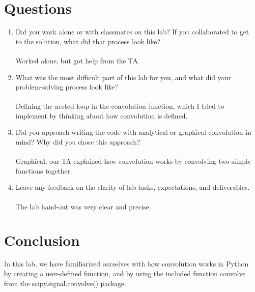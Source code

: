 \documentclass[12pt,a4paper]{article}
\begin{document}
\section{Questions}\label{sec:res}
\begin{enumerate}
    \item
    Did you work alone or with classmates on this lab? If you collaborated to get to the solution,
    what did that process look like?\\
    \\Worked alone, but got help from the TA.\\
    
    \item
    What was the most difficult part of this lab for you, and what did your problem-solving
    process look like?\\
    \\Defining the nested loop in the convolution function, which I tried to implement by thinking about how convolution is defined.\\
    
    \item
    Did you approach writing the code with analytical or graphical convolution in mind? Why
    did you chose this approach?\\
    \\Graphical, our TA explained how convolution works by convolving two simple functions together. \\
    
    \item
    Leave any feedback on the clarity of lab tasks, expectations, and deliverables.\\
    \\The lab hand-out was very clear and precise.
    
\end{enumerate}
\section{Conclusion}\label{sec:res}
    In this lab, we have familiarized ourselves with how convolution works in Python by creating a user-defined function, and by using the included function convolve from the scipy.signal.convolve() package.


\end{document}
